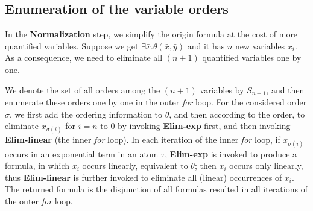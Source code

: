 \subsection{Enumeration of the variable orders} 


In the \textbf{Normalization} step, we simplify the origin formula at the cost of more quantified variables. Suppose we get $\exists \bar{x}.\theta(\bar{x},\bar{y})$ and it has $n$ new variables $x_i$. As a consequence, we need to eliminate all $(n+1)$ quantified variables one by one. 

We denote the set of all orders among the $(n+1)$ variables by $S_{n+1}$, and then enumerate these orders one by one in the outer \textit{for} loop. For the considered order $\sigma$, we first add the ordering information to $\theta$, and then according to the order, to eliminate $x_{\sigma(i)}$ for $i=n$ to $0$ by invoking \textbf{Elim-exp} first, and then invoking \textbf{Elim-linear} (the inner \textit{for} loop). In each iteration of the inner \textit{for} loop, if $x_{\sigma{(i)}}$ occurs in an exponential term in an atom $\tau$, \textbf{Elim-exp} is invoked to produce a formula, in which $x_i$ occurs linearly, equivalent to $\theta$;  
then $x_i$ occurs only linearly, thus \textbf{Elim-linear} is further invoked to eliminate all (linear) occurrences of $x_i$. The returned formula is the disjunction of all formulas resulted in all iterations of the outer \textit{for} loop. 
 
\iffalse
put , We now specify an order of $\bar{x}$, and recursively eliminate the maximal element in the remaining $\bar{x}$. 
That is to say,
every execution of \textbf{Elim-exp} and \textbf{Elim-linear} will eliminate the largest element $x_i$ in $\bar{x}$.
However, as you may notice, if there is no clue about the order of $\bar{x}$, 
we will have to use the idea of permutation group and the number of sub-cases will blow up, in the worst case, $(n+1)!$ cases. 

Here is how \textbf{Elim-exp} and \textbf{Elim-linear} are invoked in
\textb
At thef{Ordering and QE}. 
\fi

